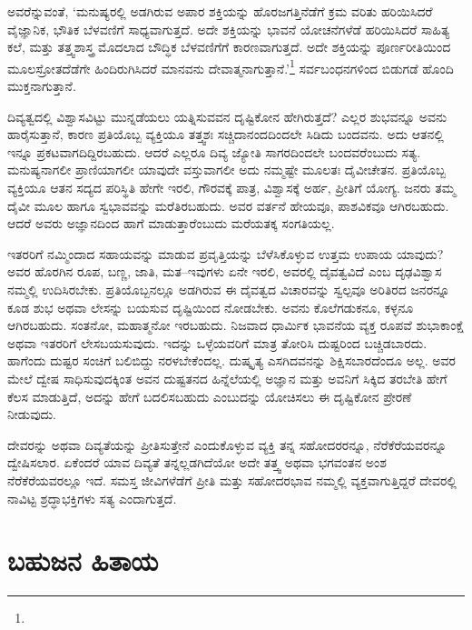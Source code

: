 ಅವರೆನ್ನುವಂತೆ, ‘ಮನುಷ್ಯರಲ್ಲಿ ಅಡಗಿರುವ ಅಪಾರ ಶಕ್ತಿಯನ್ನು ಹೊರಜಗತ್ತಿನೆಡೆಗೆ ಕ್ರಮ ವರಿತು ಹರಿಯಿಸಿದರೆ ವೈಜ್ಞಾನಿಕ, ಭೌತಿಕ ಬೆಳವಣಿಗೆ ಸಾಧ್ಯವಾಗುತ್ತದೆ. ಅದೇ ಶಕ್ತಿಯನ್ನು ಭಾವನೆ ಯೋಚನೆಗಳೆಡೆ ಹರಿಯಿಸಿದರೆ ಸಾಹಿತ್ಯ ಕಲೆ, ಮತ್ತು ತತ್ತ್ವಶಾಸ್ತ್ರ ಮೊದಲಾದ ಬೌದ್ಧಿಕ ಬೆಳವಣಿಗೆಗೆ ಕಾರಣವಾಗುತ್ತದೆ. ಅದೇ ಶಕ್ತಿಯನ್ನು ಪೂರ್ಣರೀತಿಯಿಂದ ಮೂಲಸ್ರೋತದೆಡೆಗೇ ಹಿಂದಿರುಗಿಸಿದರೆ ಮಾನವನು ದೇವಾತ್ಮನಾಗುತ್ತಾನೆ.’\footnote{\hfill{}} ಸರ್ವಬಂಧನಗಳಿಂದ ಬಿಡುಗಡೆ ಹೊಂದಿ ಮುಕ್ತನಾಗುತ್ತಾನೆ.

ದಿವ್ಯತ್ವದಲ್ಲಿ ವಿಶ್ವಾಸವಿಟ್ಟು ಮುನ್ನಡೆಯಲು ಯತ್ನಿಸುವವನ ದೃಷ್ಟಿಕೋನ ಹೇಗಿರುತ್ತದೆ? ಎಲ್ಲರ ಶುಭವನ್ನೂ ಅವನು ಹಾರೈಸುತ್ತಾನೆ, ಕಾರಣ ಪ್ರತಿಯೊಬ್ಬ ವ್ಯಕ್ತಿಯೂ ತತ್ತ್ವಶಃ ಸಚ್ಚಿದಾನಂದ\-ದಿಂದಲೇ ಸಿಡಿದು ಬಂದವನು. ಅದು ಆತನಲ್ಲಿ ಇನ್ನೂ ಪ್ರಕಟವಾಗದಿದ್ದಿರಬಹುದು. ಆದರೆ ಎಲ್ಲರೂ ದಿವ್ಯ ಜ್ಯೋತಿ ಸಾಗರದಿಂದಲೇ ಬಂದವರೆಂಬುದು ಸತ್ಯ. ಮನುಷ್ಯನಾಗಲೀ ಪ್ರಾಣಿ\-ಯಾಗಲೀ ಯಾವುದೇ ವಸ್ತುವಾಗಲೀ ಅದು ನಮ್ಮಷ್ಟೇ ಮೂಲತಃ ದೈವೀಚೇತನ. ಪ್ರತಿಯೊಬ್ಬ ವ್ಯಕ್ತಿಯೂ ಆತನ ಸದ್ಯದ ಪರಿಸ್ಥಿತಿ ಹೇಗೇ ಇರಲಿ, ಗೌರವಕ್ಕೆ ಪಾತ್ರ, ವಿಶ್ವಾಸಕ್ಕೆ ಅರ್ಹ, ಪ್ರೀತಿಗೆ ಯೋಗ್ಯ. ಜನರು ತಮ್ಮ ದೈವೀ ಮೂಲ ಹಾಗೂ ಸ್ವಭಾವವನ್ನು ಮರೆತಿರಬಹುದು. ಅವರ ವರ್ತನೆ ಹೇಯವೂ, ಪಾಶವಿಕವೂ ಆಗಿರಬಹುದು. ಆದರೆ ಅವರು ಅಜ್ಞಾನದಿಂದ ಹಾಗೆ ಮಾಡುತ್ತಾರೆಂಬುದು ಮರೆಯತಕ್ಕ ಸಂಗತಿಯಲ್ಲ.

ಇತರರಿಗೆ ನಮ್ಮಿಂದಾದ ಸಹಾಯವನ್ನು ಮಾಡುವ ಪ್ರವೃತ್ತಿಯನ್ನು ಬೆಳೆಸಿಕೊಳ್ಳುವ ಉತ್ತಮ ಉಪಾಯ ಯಾವುದು? ಅವರ ಹೊರಗಿನ ರೂಪ, ಬಣ್ಣ, ಜಾತಿ, ಮತ–ಇವುಗಳು ಏನೇ ಇರಲಿ, ಅವರಲ್ಲಿ ದೈವತ್ವವಿದೆ ಎಂಬ ದೃಢವಿಶ್ವಾಸ ನಮ್ಮಲ್ಲಿ ಉದಿಸಿರಬೇಕು. ಪ್ರತಿಯೊಬ್ಬನಲ್ಲೂ ಅಡಗಿರುವ ಈ ದೈವತ್ವದ ವಿಚಾರವನ್ನು ಸ್ವಲ್ಪವೂ ಅರಿತಿರದ ಜನರನ್ನೂ ಕೂಡ ಶುಭ ಅಥವಾ ಲೇಸನ್ನು ಬಯಸುವ ದೃಷ್ಟಿಯಿಂದ ನೋಡಬೇಕು. ಅವನು ಕೊಲೆಗಡುಕನೂ, ಕಳ್ಳನೂ ಆಗಿರಬಹುದು. ಸಂತನೋ, ಮಹಾತ್ಮನೋ ಇರಬಹುದು. ನಿಜವಾದ ಧಾರ್ಮಿಕ ಭಾವನೆಯ ವ್ಯಕ್ತ ರೂಪವೆ ಶುಭಾಕಾಂಕ್ಷೆ ಅಥವಾ ಇತರರಿಗೆ ಲೇಸಬಯಸುವುದು. ಇದನ್ನು ಒಳ್ಳೆಯವರಿಗೆ ಮಾತ್ರ ತೋರಿಸಿ ದುಷ್ಟರಿಂದ ಬಚ್ಚಿಡಬಾರದು. ಹಾಗೆಂದು ದುಷ್ಟರ ಸಂಚಿಗೆ ಬಲಿಬಿದ್ದು ನರಳಬೇಕೆಂದಲ್ಲ. ದುಷ್ಕೃತ್ಯ ಎಸಗಿದವನನ್ನು ಶಿಕ್ಷಿಸಬಾರದೆಂದೂ ಅಲ್ಲ. ಅವರ ಮೇಲೆ ದ್ವೇಷ ಸಾಧಿಸುವುದಕ್ಕಿಂತ ಅವನ ದುಷ್ಟತನದ ಹಿನ್ನೆಲೆಯಲ್ಲಿ ಅಜ್ಞಾನ ಮತ್ತು ಅವನಿಗೆ ಸಿಕ್ಕಿದ ತರಬೇತಿ ಹೇಗೆ ಕೆಲಸ ಮಾಡುತ್ತಿದೆ, ಅದನ್ನು ಹೇಗೆ ಬದಲಿಸಬಹುದು ಎಂಬುದನ್ನು ಯೋಚಿಸಲು ಈ ದೃಷ್ಟಿಕೋನ ಪ್ರೇರಣೆ ನೀಡುವುದು.

ದೇವರನ್ನು ಅಥವಾ ದಿವ್ಯತೆಯನ್ನು ಪ್ರೀತಿಸುತ್ತೇನೆ ಎಂದುಕೊಳ್ಳುವ ವ್ಯಕ್ತಿ ತನ್ನ ಸಹೋದರ\-ರನ್ನೂ, ನೆರೆಕೆರೆಯವರನ್ನೂ ದ್ವೇಷಿಸಲಾರ. ಏಕೆಂದರೆ ಯಾವ ದಿವ್ಯತೆ ತನ್ನಲ್ಲಡಗಿದೆಯೋ ಅದೇ ತತ್ತ್ವ ಅಥವಾ ಭಗವಂತನ ಅಂಶ ನೆರೆಕೆರೆಯವರಲ್ಲೂ ಇದೆ. ಸಮಸ್ತ ಜೀವಿಗಳೆಡೆಗೆ ಪ್ರೀತಿ ಮತ್ತು ಸಹೋದರಭಾವ ನಮ್ಮಲ್ಲಿ ವ್ಯಕ್ತವಾಗುತ್ತಿದ್ದರೆ ದೇವರಲ್ಲಿ ನಾವಿಟ್ಟ ಶ್ರದ್ಧಾಭಕ್ತಿಗಳು ಸತ್ಯ ಎಂದಾಗುತ್ತದೆ.


\section*{ಬಹುಜನ ಹಿತಾಯ}

